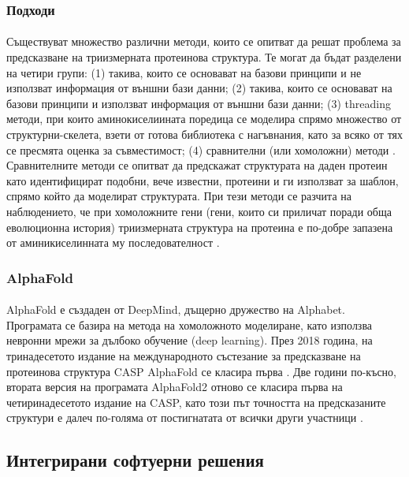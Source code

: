 \documentclass[pdftex,cyrillic,14pt,a4page,twoside,openright]{extreport}
\begin{document}
\subsubsection{Подходи}
\paragraph{}
Съществуват множество различни методи, които се опитват да решат проблема за предсказване на триизмерната протеинова структура. Те могат да бъдат разделени на четири групи: (1) такива, които се основават на базови принципи и не използват информация от външни бази данни; (2) такива, които се основават на базови принципи и използват информация от външни бази данни; (3) threading методи, при които аминокиселиината поредица се моделира спрямо множество от структурни-скелета, взети от готова библиотека с нагъвнания, като за всяко от тях се пресмята оценка за съвместимост; (4) сравнителни (или хомоложни) методи \cite{dorn2014}. Сравнителните методи се опитват да предскажат структурата на даден протеин като идентифицират подобни, вече известни, протеини и ги използват за шаблон, спрямо който да моделират структурата. При тези методи се разчита на наблюдението, че при хомоложните гени (гени, които си приличат поради обща еволюционна история) триизмерната структура на протеина е по-добре запазена от аминикиселинната му последователност \cite{illergard2009}.


\subsubsection{AlphaFold}\label{sec:alphafold}
\paragraph{}
AlphaFold е създаден от DeepMind, дъщерно дружество на Alphabet. Програмата се базира на метода на хомоложното моделиране, като използва невронни мрежи за дълбоко обучение (deep learning). През 2018 година, на тринадесетото издание на международното състезание за предсказване на протеинова структура CASP AlphaFold се класира първа \cite{alquraishi2019}. Две години по-късно, втората версия на програмата AlphaFold2 отново се класира първа на четиринадесетото издание на CASP, като този път точността на предсказаните структури е далеч по-голяма от постигнатата от всички други участници \cite{alphafold2021}.

\subsection{Интегрирани софтуерни решения}
\end{document}
